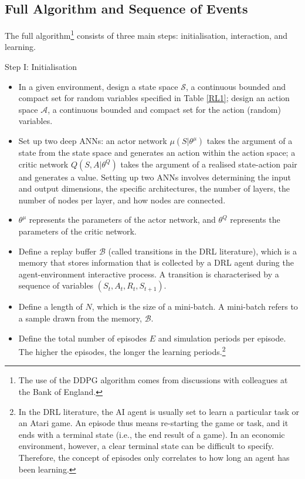 \documentclass[hidelinks]{article}
\begin{document}
\subsection{Full Algorithm and Sequence of Events}
\label{fullalgo}

The full algorithm\footnote{The use of the DDPG algorithm comes from discussions with colleagues at the Bank of England.} consists of three main steps: initialisation, interaction, and learning.
\vspace{1cm}

Step I: Initialisation

\begin{itemize}
	\item In a given environment, design a state space $\mathcal{S}$, a continuous bounded and compact set for random variables specified in Table \ref{RL1}; design an action space $\mathcal{A}$, a continuous bounded and compact set for the action (random) variables. 
	
	\item Set up two deep ANNs: an actor network $\mu(S|\theta^\mu)$ takes the argument of a state from the state space and generates an action within the action space; a critic network $Q(S,A|\theta^Q)$ takes the argument of a realised state-action pair and generates a value. Setting up two ANNs involves determining the input and output dimensions, the specific architectures, the number of layers, the number of nodes per layer, and how nodes are connected. 
	
	\item $\theta^\mu$ represents the parameters of the actor network, and $\theta^Q$ represents the parameters of the critic network.
	
	\item Define a replay buffer $\mathcal{B}$ (called transitions in the DRL literature), which is a memory that stores information that is collected by a DRL agent during the agent-environment interactive process. A transition is characterised by a sequence of variables $(S_t, A_t, R_t, S_{t+1})$.
	
	\item Define a length of $N$, which is the size of a mini-batch. A mini-batch refers to a sample drawn from the memory, $\mathcal{B}$. 
	
	\item Define the total number of episodes $E$ and simulation periods per episode. The higher the episodes, the longer the learning periods.\footnote{In the DRL literature, the AI agent is usually set to learn a particular task or an Atari game. An episode thus means re-starting the game or task, and it ends with a terminal state (i.e., the end result of a game). In an economic environment, however, a clear terminal state can be difficult to specify. Therefore, the concept of episodes only correlates to how long an agent has been learning.}
	
\end{itemize}
\end{document}
